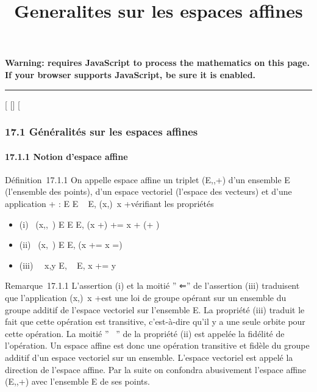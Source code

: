 \documentclass[]{article}
\title{Generalites sur les espaces affines}
\author{}
\date{}
\begin{document}
\maketitle

\textbf{Warning: 
requires JavaScript to process the mathematics on this page.\\ If your
browser supports JavaScript, be sure it is enabled.}

\begin{center}\rule{3in}{0.4pt}\end{center}

{[}
{[}{]}
{[}

\subsubsection{17.1 Généralités sur les espaces affines}

\paragraph{17.1.1 Notion d'espace affine}

Définition~17.1.1 On appelle espace affine un triplet
(E,\overrightarrowE,+) d'un ensemble E (l'ensemble
des points), d'un espace vectoriel \overrightarrowE
(l'espace des vecteurs) et d'une application + : E
\times\overrightarrow E \rightarrow~ E,
(x,\overrightarrow\xi)\mapsto~x
+\overrightarrow \xi vérifiant les propriétés

\begin{itemize}
\itemsep1pt\parskip0pt
\item
  (i)
  \forall~(x,\overrightarrow\xi,\overrightarrow\eta~)
  \in E \times\overrightarrow E
  \times\overrightarrow E, (x
  +\overrightarrow \xi)
  +\overrightarrow \eta = x +
  (\overrightarrow\xi +\overrightarrow
  \eta)
\item
  (ii)
  \forall~(x,\overrightarrow\xi~) \in E
  \times\overrightarrow E, \left (x
  +\overrightarrow \xi = x \Leftrightarrow
  \overrightarrow\xi =\right )
\item
  (iii) \forall~~x,y \in E,
  \exists\overrightarrow\xi~
  \in\overrightarrow E, x
  +\overrightarrow \xi = y
\end{itemize}

Remarque~17.1.1 L'assertion (i) et la moitié '' ⇐'' de l'assertion (iii)
traduisent que l'application
(x,\overrightarrow\xi)\mapsto~x
+\overrightarrow \xi est une loi de groupe opérant sur
un ensemble du groupe additif de l'espace vectoriel
\overrightarrowE sur l'ensemble E. La propriété (iii)
traduit le fait que cette opération est transitive, c'est-à-dire qu'il y
a une seule orbite pour cette opération. La moitié '' \rigtharrow~'' de la
propriété (ii) est appelée la fidélité de l'opération. Un espace affine
est donc une opération transitive et fidèle du groupe additif d'un
espace vectoriel sur un ensemble. L'espace vectoriel
\overrightarrowE est appelé la direction de l'espace
affine. Par la suite on confondra abusivement l'espace affine
(E,\overrightarrowE,+) avec l'ensemble E de ses
points.
\end{document}
